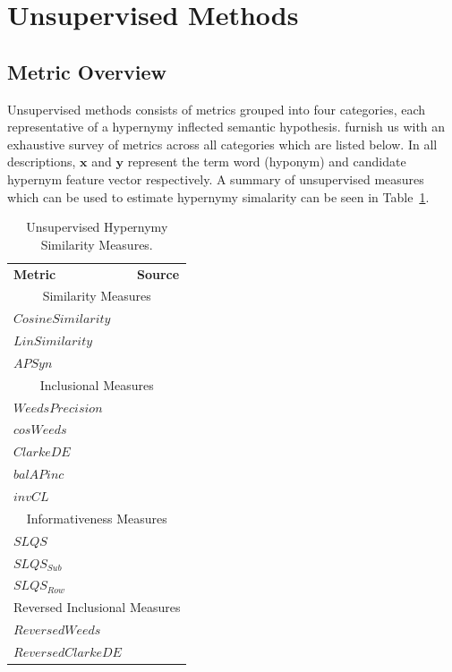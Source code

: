 \section{Unsupervised Methods}
\subsection{Metric Overview}
Unsupervised methods consists of metrics grouped into four categories, each representative of a hypernymy inflected semantic hypothesis.  \citeauthor{shwartz2017siege} furnish us with an exhaustive survey of metrics across all categories which are listed below.  In all descriptions, $\textbf{x}$ and $\textbf{y}$ represent the term word (hyponym) and candidate hypernym feature vector respectively.  A summary of unsupervised measures which can be used to estimate hypernymy simalarity can be seen in Table~\ref{tab:unsupervised_measures}.

\renewcommand{\arraystretch}{1.2} 
\begin{table}\centering
    \begin{tabular}{@{}ll@{}} \toprule
    \textbf{Metric}              & \textbf{Source} \\ 
    \cmidrule{1-2}
    \multicolumn{2}{c}{Similarity Measures} \\ \cmidrule(lr){1-2}
    $Cosine Similarity$   & \citep{salton1975vector} \\
    $Lin Similarity$      & \citep{lin1998information} \\
    $APSyn$               & \citep{santus2016unsupervised} \\
    \cmidrule{1-2}
    \multicolumn{2}{c}{Inclusional Measures} \\ \cmidrule(lr){1-2}
    $Weeds Precision$     & \citep{weeds2003general} \\
    $cosWeeds$            & \citep{lenci2012identifying} \\ 
    $ClarkeDE$            & \citep{clarke2009context} \\
    $balAPinc$            & \citep{kotlerman2010directional} \\
    $invCL$               & \citep{lenci2012identifying} \\
    \cmidrule{1-2}
    \multicolumn{2}{c}{Informativeness Measures} \\ \cmidrule(lr){1-2}
    $SLQS$                & \citep{santus2014chasing} \\
    $SLQS_{Sub}$            & \citep{shwartz2017siege} \\
    $SLQS_{Row}$            & \citep{shwartz2017siege} \\
    \cmidrule{1-2}
    \multicolumn{2}{c}{Reversed Inclusional Measures} \\ \cmidrule(lr){1-2}
    $Reversed Weeds$      & \citep{shwartz2017siege} \\
    $Reversed ClarkeDE$   & \citep{shwartz2017siege} \\
    \bottomrule
    \end{tabular}
    \caption{Unsupervised Hypernymy Similarity Measures.}\label{tab:unsupervised_measures}
\end{table}



